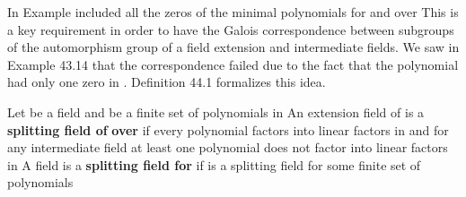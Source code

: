 \documentclass[11pt,oneside]{article}
\begin{document}
\fi
\renewcommand{\BookFooter}{Section 44 Splitting Fields}
\ifdefined\BookMaster\else\setcounter{page}{349}\fi
\BookNarrativetrue

\begin{BookBody}


In Example  included all the zeros of the minimal polynomials for  and  over  This is a key requirement in order to have the Galois correspondence between subgroups of the automorphism group of a field extension and intermediate fields. We saw in Example 43.14 that the correspondence failed due to the fact that the polynomial  had only one zero in . Definition 44.1 formalizes this idea.

 Let  be a field and  be a finite set of polynomials in  An extension field  of  is a\textbf{ splitting field of}  \textbf{over}  if every polynomial  factors into linear factors in  and for any intermediate field  at least one polynomial  does not factor into linear factors in  A field  is a\textbf{ split}\textbf{ting field for}  if  is a splitting field for some finite set of polynomials\BookEnd{\blacksquare}

\end{BookBody}

\BookNarrativetrue
\end{document}
